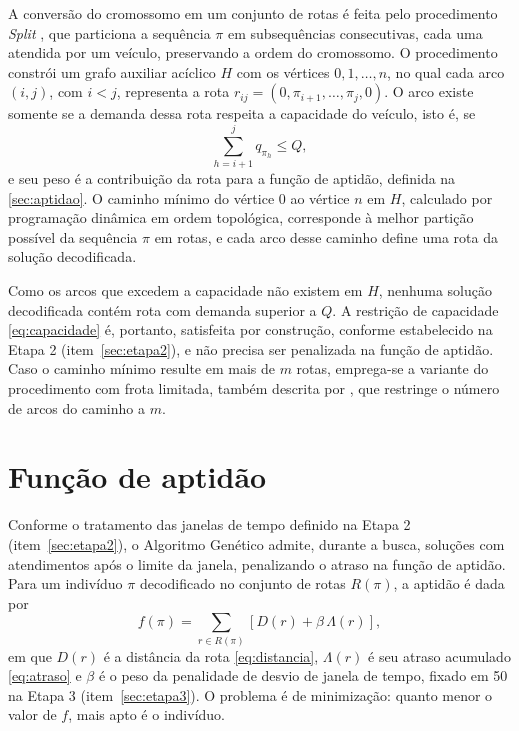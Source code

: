 A conversão do cromossomo em um conjunto de rotas é feita pelo procedimento
\textit{Split} \cite{prins2004}, que particiona a sequência $\pi$ em subsequências
consecutivas, cada uma atendida por um veículo, preservando a ordem do cromossomo. O
procedimento constrói um grafo auxiliar acíclico $H$ com os vértices $0, 1, \dots, n$,
no qual cada arco $(i, j)$, com $i < j$, representa a rota $r_{ij} = (0, \pi_{i+1},
\dots, \pi_j, 0)$. O arco existe somente se a demanda dessa rota respeita a capacidade
do veículo, isto é, se
\begin{equation}
	\sum_{h = i+1}^{j} q_{\pi_h} \leq Q,
	\label{eq:split-capacidade}
\end{equation}
e seu peso é a contribuição da rota para a função de aptidão, definida na
\autoref{sec:aptidao}. O caminho mínimo do vértice $0$ ao vértice $n$ em $H$,
calculado por programação dinâmica em ordem topológica, corresponde à melhor partição
possível da sequência $\pi$ em rotas, e cada arco desse caminho define uma rota da
solução decodificada.

Como os arcos que excedem a capacidade não existem em $H$, nenhuma solução decodificada
contém rota com demanda superior a $Q$. A restrição de capacidade \eqref{eq:capacidade}
é, portanto, satisfeita por construção, conforme estabelecido na Etapa 2
(item~\ref{sec:etapa2}), e não precisa ser penalizada na função de aptidão. Caso o
caminho mínimo resulte em mais de $m$ rotas, emprega-se a variante do procedimento com
frota limitada, também descrita por , que restringe o número de
arcos do caminho a $m$.

\section{Função de aptidão}
\label{sec:aptidao}

Conforme o tratamento das janelas de tempo definido na Etapa 2 (item~\ref{sec:etapa2}),
o Algoritmo Genético admite, durante a busca, soluções com atendimentos após o limite da
janela, penalizando o atraso na função de aptidão. Para um indivíduo $\pi$ decodificado
no conjunto de rotas $R(\pi)$, a aptidão é dada por
\begin{equation}
	f(\pi) = \sum_{r \in R(\pi)} \left[ D(r) + \beta \, \Lambda(r) \right],
	\label{eq:aptidao}
\end{equation}
em que $D(r)$ é a distância da rota \eqref{eq:distancia}, $\Lambda(r)$ é seu atraso
acumulado \eqref{eq:atraso} e $\beta$ é o peso da penalidade de desvio de janela de
tempo, fixado em 50 na Etapa 3 (item~\ref{sec:etapa3}). O problema é de minimização:
quanto menor o valor de $f$, mais apto é o indivíduo.

